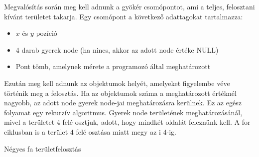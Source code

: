 Megvalósítás során meg kell adnunk a gyökér csomópontot, ami a teljes, felosztani kívánt területet takarja. Egy csomópont a következő adattagokat tartalmazza:
\begin{itemize}
\item $x$ és $y$ pozíció
\item 4 darab gyerek node (ha nincs, akkor az adott node értéke NULL)
\item Pont tömb, amelynek mérete a programozó által meghatározott
\end{itemize}

Ezután meg kell adnunk az objektumok helyét, amelyeket figyelembe véve történik meg a felosztás. Ha az objektumok száma a meghatározott értéknél nagyobb, az adott node gyerek node-jai meghatározásra kerülnek. Ez az egész folyamat egy rekurzív algoritmus. Gyerek node területének meghatározásánál, mivel a területet 4 felé osztjuk, adott, hogy mindkét oldalát feleznünk kell. A for ciklusban is a terület 4 felé osztása miatt megy az i 4-ig. 

\begin{algorithm}[H]
 \caption{Négyes fa területfelosztás}
\end{algorithm}
